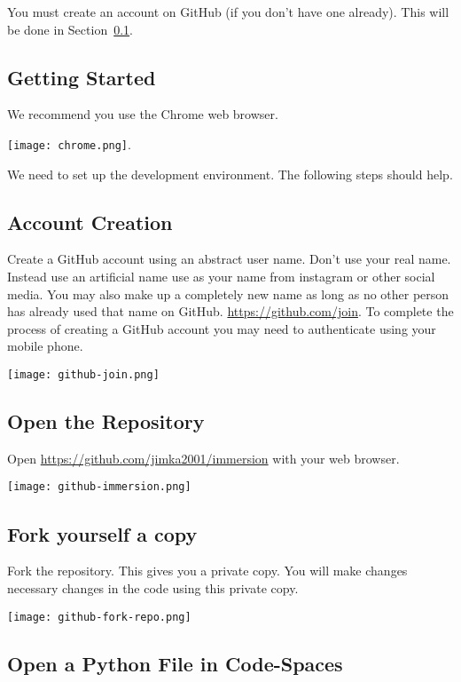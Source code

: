 You must create an account on GitHub (if you don't have one already).
This will be done in Section~\ref{sec.setup}.


\subsection{Getting Started}
\label{sec.setup}

We recommend you use the Chrome web browser.

\texttt{[image: chrome.png]}.

We need to set up the development environment.  The following steps should
help.

\subsection{Account Creation}
  
Create a GitHub account using an abstract user name.  Don't use your
real name.  Instead use an artificial name use as your name from
instagram or other social media.  You may also make up a completely
new name as long as no other person has already used that name on
GitHub.  \url{https://github.com/join}.  To complete the process of
creating a GitHub account you may need to authenticate using your
mobile phone.


\noindent\texttt{[image: github-join.png]}



\subsection{Open the Repository}
  
Open \url{https://github.com/jimka2001/immersion} with your web browser.

\noindent\texttt{[image: github-immersion.png]}


\subsection{Fork yourself a copy}

Fork the repository.  This gives you a private copy.  You will make changes
necessary changes in the code using this private copy.

\noindent \texttt{[image: github-fork-repo.png]}



\subsection{Open a Python File in Code-Spaces}
  
